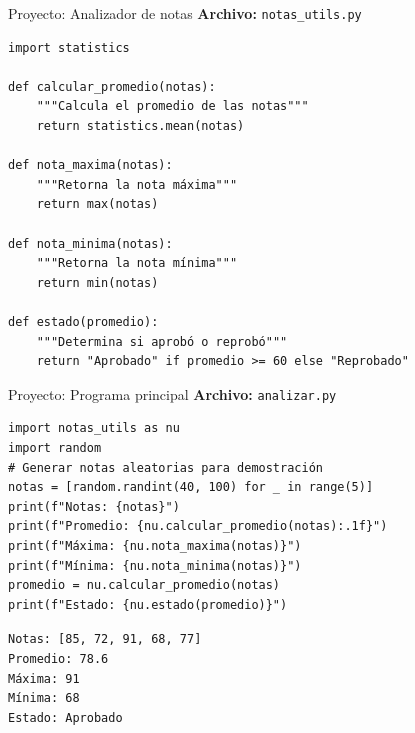 \documentclass{beamer}
\begin{document}
\begin{frame}[fragile]{Proyecto: Analizador de notas \faGraduationCap}
\textbf{Archivo:} \texttt{notas\_utils.py}
\begin{lstlisting}
import statistics

def calcular_promedio(notas):
    """Calcula el promedio de las notas"""
    return statistics.mean(notas)

def nota_maxima(notas):
    """Retorna la nota máxima"""
    return max(notas)

def nota_minima(notas):
    """Retorna la nota mínima"""
    return min(notas)

def estado(promedio):
    """Determina si aprobó o reprobó"""
    return "Aprobado" if promedio >= 60 else "Reprobado"
\end{lstlisting}
\end{frame}

\begin{frame}[fragile]{Proyecto: Programa principal \faDesktop}
\textbf{Archivo:} \texttt{analizar.py}
\begin{lstlisting}
import notas_utils as nu
import random
# Generar notas aleatorias para demostración
notas = [random.randint(40, 100) for _ in range(5)]
print(f"Notas: {notas}")
print(f"Promedio: {nu.calcular_promedio(notas):.1f}")
print(f"Máxima: {nu.nota_maxima(notas)}")
print(f"Mínima: {nu.nota_minima(notas)}")
promedio = nu.calcular_promedio(notas)
print(f"Estado: {nu.estado(promedio)}")
\end{lstlisting}

\vspace{-0.2cm}
\begin{tcolorbox}[colback=green!10,colframe=green,title={\small\faArrowCircleRight \ Salida (ejemplo)},coltitle=fg0,left=3pt,right=3pt,top=2pt,bottom=2pt,boxsep=1pt]
\small\texttt{Notas: [85, 72, 91, 68, 77]\\
Promedio: 78.6\\
Máxima: 91\\
Mínima: 68\\
Estado: Aprobado}
\end{tcolorbox}
\end{frame}
\end{document}
